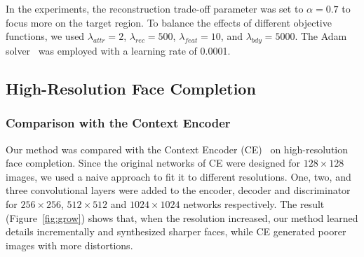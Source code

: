 \documentclass[acmtog,timestamp]{acmart}
\begin{document}
In the experiments, the reconstruction trade-off parameter was set to $\alpha=0.7$ to focus more on the target region. To balance the effects of different objective functions, we used  $\lambda_{attr}= 2$, $\lambda_{rec}=500$, $\lambda_{feat}=10$, and $\lambda_{bdy}=5000$. The Adam solver~\cite{kingma2014adam} was employed with a learning rate of 0.0001. 

\subsection{High-Resolution Face Completion}\subsubsection{Comparison with the Context Encoder} 
Our method was compared with the Context Encoder (CE)~\cite{pathak2016context} on high-resolution face completion. Since the original networks of CE were designed for $128\times128$ images, we used a naive approach to fit it to different resolutions. One, two, and three convolutional layers were added to the encoder, decoder and discriminator for $256\times256$, $512\times512$ and $1024\times1024$ networks respectively. The result (Figure~\ref{fig:grow}) shows that, when the resolution increased, our method learned details incrementally and synthesized sharper faces, while CE generated poorer images with more distortions.
\end{document}

